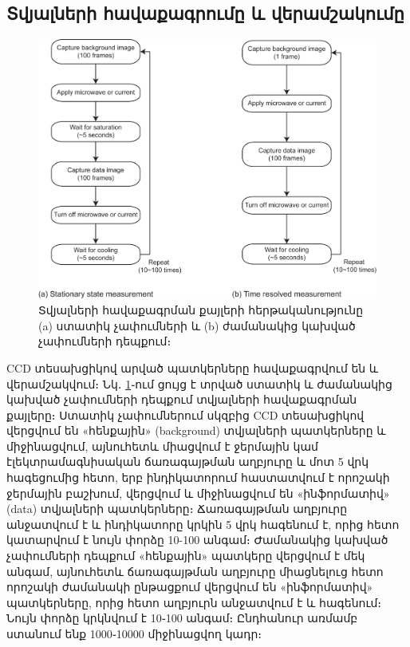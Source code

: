 \documentclass[12pt, fleqn]{report}
\begin{document}
\subsection{Տվյալների հավաքագրումը և վերամշակումը}
\begin{figure}
    \centering
    \includegraphics[width=1.0\textwidth]{data/TEOIM/3.png}
    \caption{Տվյալների հավաքագրման քայլերի հերթականությունը (a) ստատիկ չափումների և (b) ժամանակից կախված չափումների դեպքում։}
    \label{fig:data-collection-steps}
\end{figure}
CCD տեսախցիկով արված պատկերները հավաքագրվում են և վերամշակվում։ Նկ․ \ref{fig:data-collection-steps}֊ում ցույց է տրված ստատիկ և ժամանակից կախված չափումների դեպքում տվյալների հավաքագրման քայլերը։ Ստատիկ չափումներում սկզբից CCD տեսախցիկով վերցվում են «հենքային» (background) տվյալների պատկերները և միջինացվում, այնուհետև միացվում է ջերմային կամ էլեկտրամագնիսական ճառագայթման աղբյուրը և մոտ 5 վրկ հագեցումից հետո, երբ ինդիկատորում հաստատվում է որոշակի ջերմային բաշխում, վերցվում և միջինացվում են «ինֆորմատիվ» (data) տվյալների պատկերները։ Ճառագայթման աղբյուրը անջատվում է և ինդիկատորը կրկին 5 վրկ հագենում է, որից հետո կատարվում է նույն փորձը 10-100 անգամ։ Ժամանակից կախված չափումների դեպքում «հենքային» պատկերը վերցվում է մեկ անգամ, այնուհետև ճառագայթման աղբյուրը միացնելուց հետո որոշակի ժամանակի ընթացքում վերցվում են «ինֆորմատիվ» պատկերները, որից հետո աղբյուրն անջատվում է և հագենում։ Նույն փորձը կրկնվում է 10֊100 անգամ։ Ընդհանուր առմամբ ստանում ենք 1000֊10000 միջինացվող կադր։
\end{document}
